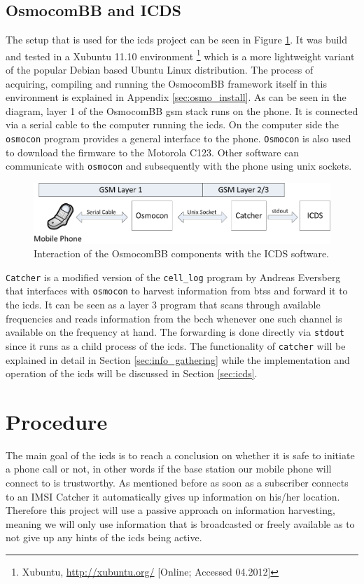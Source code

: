 \subsection{OsmocomBB and ICDS}
The setup that is used for the \gls{icds} project can be seen in Figure \ref{fig:osmo_setup}.
It was build and tested in a Xubuntu 11.10 environment \footnote{Xubuntu, \url{http://xubuntu.org/} [Online; Accessed 04.2012]} which is a more lightweight variant of the popular Debian based Ubuntu Linux distribution.
The process of acquiring, compiling and running the OsmocomBB framework itself in this environment is explained in Appendix \ref{sec:osmo_install}.
As can be seen in the diagram, layer 1 of the OsmocomBB \gls{gsm} stack runs on the phone.
It is connected via a serial cable to the computer running the \gls{icds}.
On the computer side the \texttt{osmocon} program provides a general interface to the phone.
\texttt{Osmocon} is also used to download the firmware to the Motorola C123.
Other software can communicate with \texttt{osmocon} and subsequently with the phone using unix sockets.
\begin{figure}
\centering
\includegraphics{../Images/OsmoStructure}
\caption{Interaction of the OsmocomBB components with the ICDS software.}
\label{fig:osmo_setup}
\end{figure}

\texttt{Catcher} is a modified version of the \texttt{cell\_log} program by Andreas Eversberg that interfaces with \texttt{osmocon} to harvest information from \glspl{bts} and forward it to the \gls{icds}.
It can be seen as a layer 3 program that scans through available frequencies and reads information from the \gls{bcch} whenever one such channel is available on the frequency at hand.
The forwarding is done directly via \texttt{stdout} since it runs as a child process of the \gls{icds}.
The functionality of \texttt{catcher} will be explained in detail in Section \ref{sec:info_gathering} while the implementation and operation of the \gls{icds} will be discussed in Section \ref{sec:icds}.

\section{Procedure}
The main goal of the \gls{icds} is to reach a conclusion on whether it is safe to initiate a phone call or not, in other words if the base station our mobile phone will connect to is trustworthy.
As mentioned before as soon as a subscriber connects to an IMSI Catcher it automatically gives up information on his/her location.
Therefore this project will use a passive approach on information harvesting, meaning we will only use information that is broadcasted or freely available as to not give up any hints of the \gls{icds} being active.

